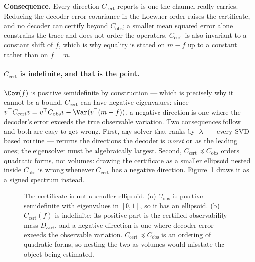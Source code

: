 \documentclass{article}
\theoremstyle{definition}
\newcommand{\Cobs}{C_{\mathrm{obs}}}
\newcommand{\Ccert}{C_{\mathrm{cert}}}
\newcommand{\Dcert}{D_{\mathrm{cert}}}
\begin{document}
\noindent\textbf{Consequence.} Every direction $\Ccert$ reports is one the channel really
carries. Reducing the decoder-error covariance in the Loewner order raises the
certificate, and no decoder can certify beyond $\Cobs$; a smaller mean squared error alone
constrains the trace and does not order the operators. $\Ccert$ is also invariant to a
constant shift of $f$, which is why equality is stated on $m-f$ up to a constant rather
than on $f=m$.

\paragraph{$\Ccert$ is indefinite, and that is the point.}
$\Cov(f)$ is positive semidefinite by construction --- which is precisely why it cannot be
a bound. $\Ccert$ can have negative eigenvalues: since
$v^\top\Ccert v=v^\top\Cobs v-\Var(v^\top(m-f))$, a negative direction is one where the
decoder's error exceeds the true observable variation. Two consequences follow and both are easy to get
wrong. First, any solver that ranks by $|\lambda|$ --- every SVD-based routine --- returns
the directions the decoder is \emph{worst} on as the leading ones; the eigensolver must be
algebraically largest. Second, $\Ccert\preceq\Cobs$ orders quadratic forms, not volumes:
drawing the certificate as a smaller ellipsoid nested inside $\Cobs$ is wrong whenever
$\Ccert$ has a negative direction. Figure~\ref{fig:certificate} draws it as a signed
spectrum instead.

\begin{figure}[t]
\centering

\caption{The certificate is not a smaller ellipsoid. (a) $\Cobs$ is positive semidefinite
with eigenvalues in $[0,1]$, so it has an ellipsoid. (b) $\Ccert(f)$ is indefinite: its
positive part is the certified observability mass $\Dcert$, and a negative direction is one
where decoder error exceeds the observable variation. $\Ccert\preceq\Cobs$ is an ordering of quadratic forms,
so nesting the two as volumes would misstate the object being estimated.}
\label{fig:certificate}
\end{figure}
\end{document}
